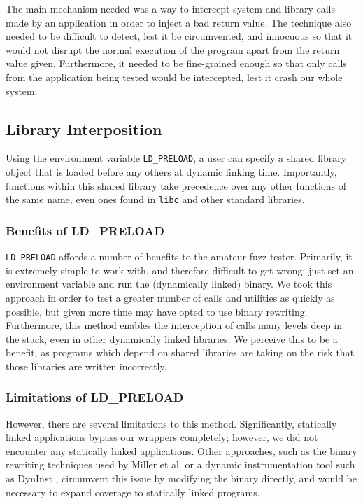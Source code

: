 The main mechanism needed was a way to intercept system and library calls made by an application in order to inject a bad return value. The technique also needed to be difficult to detect, lest it be circumvented, and innocuous so that it would not disrupt the normal execution of the program apart from the return value given. Furthermore, it needed to be fine-grained enough so that only calls from the  application being tested would be intercepted, lest it crash our whole system.

\subsection{Library Interposition}
Using the environment variable \texttt{LD\_PRELOAD}, a user can specify a shared library object that is loaded before any others at dynamic linking time. Importantly, functions within this shared library take precedence over any other functions of the same name, even ones found in \texttt{libc} and other standard libraries.

\subsubsection{Benefits of LD\_PRELOAD}
\texttt{LD\_PRELOAD} affords a number of benefits to the amateur fuzz tester. Primarily, it is extremely simple to work with, and therefore difficult to get wrong: just set an environment variable and run the (dynamically linked) binary. We took this approach in order to test a greater number of calls and utilities as quickly as possible, but given more time may have opted to use binary rewriting. Furthermore, this method enables the interception of calls many levels deep in the stack, even in other dynamically linked libraries. We perceive this to be a benefit, as programs which depend on shared libraries are taking on the risk that those libraries are written incorrectly.

\subsubsection{Limitations of LD\_PRELOAD}
However, there are several limitations to this method. Significantly, statically linked applications bypass our wrappers completely; however, we did not encounter any statically linked applications. Other approaches, such as the binary rewriting techniques used by Miller et al. \cite{bart} or a dynamic instrumentation tool such as DynInst \cite{dyninst}, circumvent this issue by modifying the binary directly, and would be necessary to expand coverage to statically linked programs.

